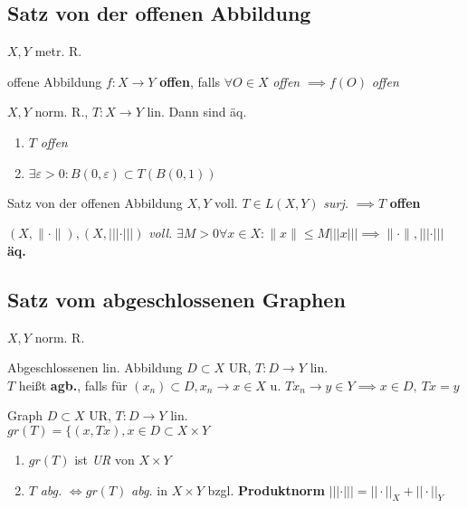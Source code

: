 \subsection{Satz von der offenen Abbildung}
$X,Y$ metr. R.

\begin{definition}{offene Abbildung}
  $f:X\to Y$ \textbf{offen}, falls $\forall O \in X$ \textit{offen}
  $\implies f(O)$ \textit{offen}
\end{definition}

\begin{lemma}
  $X,Y$ norm. R., $T:X \to Y$ lin. Dann sind äq.
  \begin{enumerate}[label = (\roman*)]
    \item $T$ \textit{offen}
    \item $\exists \varepsilon > 0 : B(0,\varepsilon) \subset T(B(0,1))$
  \end{enumerate}
\end{lemma}

\begin{satz}{Satz von der offenen Abbildung}
  $X,Y$ voll. $T \in L(X,Y)$ \textit{surj.} $\implies T$ \textbf{offen}
\end{satz}

\begin{korrolar}
  $(X,\|\cdot\|),(X,|||\cdot|||)$ \textit{voll.}
  $\exists M > 0 \forall x\in X: \|x\| \leq M |||x|||
  \implies \|\cdot\|,|||\cdot|||$ \textbf{äq.}
\end{korrolar}

\subsection{Satz vom abgeschlossenen Graphen}
$X,Y$ norm. R.

\begin{definition}{Abgeschlossenen lin. Abbildung}
  $D\subset X$ UR, $T:D \to Y$ lin.\\
  $T$ heißt \textbf{agb.}, falls für $(x_n) \subset D, x_n \to x \in X$ u.
  $Tx_n \to y \in Y \implies x \in D,\ Tx = y $
\end{definition}

\begin{definition}{Graph}
  $D\subset X$ UR, $T:D \to Y$ lin.\\
  $gr(T)=\{(x,Tx), x\in D \subset X \times Y$
\end{definition}

\begin{bemerkung}
  \begin{enumerate}[label=(\roman*)]
    \item $gr(T)$ ist \textit{UR} von $X \times Y$
    \item $T$ \textit{abg.} $\Leftrightarrow gr(T)$ \textit{abg.} in
      $X \times Y$ bzgl. \textbf{Produktnorm}
      $|||\cdot||| = ||\cdot||_X + ||\cdot||_Y$
  \end{enumerate}
\end{bemerkung}

